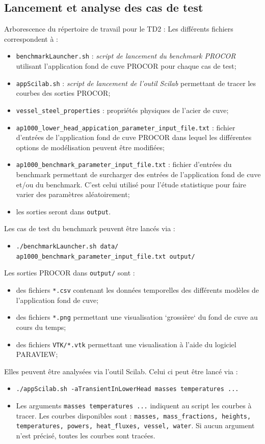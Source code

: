 \documentclass[3p]{elsarticle}
\begin{document}
\subsection{Lancement et analyse des cas de test}
Arborescence du répertoire de travail pour le TD2 :
Les différents fichiers correspondent à :
\begin{itemize}
	\item \texttt{benchmarkLauncher.sh} : \emph{script de lancement du benchmark PROCOR} utilisant l'application fond de cuve PROCOR pour chaque cas de test;
	\item \texttt{appScilab.sh} : \emph{script de lancement de l'outil Scilab} permettant de tracer les courbes des sorties PROCOR;
	\item \texttt{vessel\_steel\_properties} : propriétés physiques de l'acier de cuve;
	\item \texttt{ap1000\_lower\_head\_appication\_parameter\_input\_file.txt} : fichier d'entrées de l'application fond de cuve PROCOR dans lequel les différentes options de modélisation peuvent être modifiées;
	\item \texttt{ap1000\_benchmark\_parameter\_input\_file.txt} : fichier d'entrées du benchmark permettant de surcharger des entrées de l'application fond de cuve et/ou du benchmark. C'est celui utilisé pour l'étude statistique pour faire varier des paramètres aléatoirement;
	\item les sorties seront dans \texttt{output}.
\end{itemize}
Les cas de test du benchmark peuvent être lancés via :
\begin{itemize}
\item \texttt{./benchmarkLauncher.sh data/ ap1000\_benchmark\_parameter\_input\_file.txt output/}
\end{itemize}
Les sorties PROCOR dans \texttt{output/} sont :
\begin{itemize}
\item des fichiers \texttt{*.csv} contenant les données temporelles des différents modèles de l'application fond de cuve;
\item des fichiers \texttt{*.png} permettant une visualisation `grossière` du fond de cuve au cours du temps;
\item des fichiers \texttt{VTK/*.vtk} permettant une visualisation à l'aide du logiciel PARAVIEW;
\end{itemize}
Elles peuvent être analysées via l'outil Scilab. Celui ci peut être lancé via :
\begin{itemize}
\item \texttt{./appScilab.sh -aTransientInLowerHead masses temperatures ...}
\item Les arguments \texttt{masses temperatures ...} indiquent au script les courbes à tracer. Les courbes disponibles sont : \texttt{masses, mass\_fractions, heights, temperatures, powers, heat\_fluxes, vessel, water}. Si aucun argument n'est précisé, toutes les courbes sont tracées.
\end{itemize}
\end{document}
